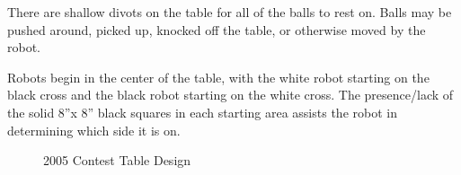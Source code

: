 There are shallow divots on the table for all of the balls to
rest on.  Balls may be pushed around, picked up, knocked off the
table, or otherwise moved by the robot.

Robots begin in the center of the table, with the white robot starting on the black cross and the black robot starting on the white cross.  The presence/lack of the solid 8''x 8'' black squares in each starting area assists the robot in
determining which side it is on. 

\epsfysize=5.0in
\begin{figure}[htp]
\begin{center}
\caption{2005 Contest Table Design}
\label{tablepic}
\end{center}
\end{figure}


